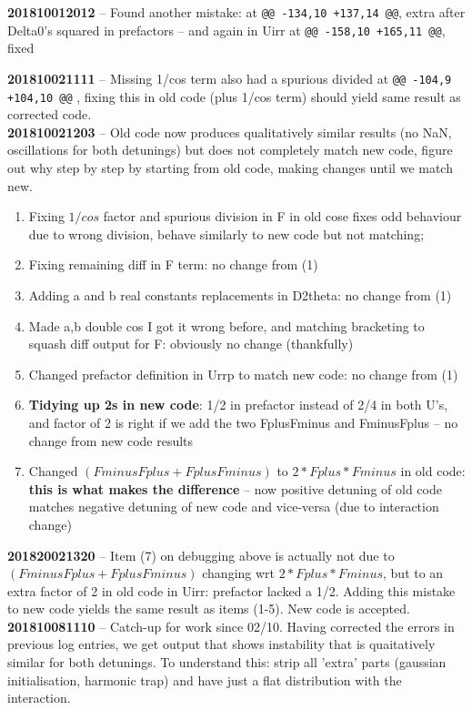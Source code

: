 \documentclass[a4paper,nobalancelastpage]{revtex4-1}
\newcommand{\mmtitle}[1]{\textcolor{multimode}{\textbf{#1}}}
\begin{document}
\mmtitle{201810012012} -- Found another mistake:  at \texttt{@@ -134,10 +137,14 @@}, extra \* after Delta0's squared in prefactors -- and again in Uirr at \texttt{@@ -158,10 +165,11 @@}, fixed

\mmtitle{201810021111} -- Missing 1/cos term also had a spurious divided at  \texttt{@@ -104,9 +104,10 @@} , fixing this in old code (plus 1/cos term) should yield same result as corrected code.\\

\mmtitle{201810021203} -- Old code now produces qualitatively similar results (no NaN, oscillations for both detunings) but does not completely match new code, figure out why step by step by starting from old code, making changes until we match new.
\begin{enumerate}
\item Fixing $1/cos$ factor and spurious division in F in old cose fixes odd behaviour due to wrong division, behave similarly to new code but not matching;
\item Fixing remaining diff in F term: no change from (1)
\item Adding a and b real constants replacements in D2theta: no change from (1)
\item Made a,b double cos I got it wrong before, and matching bracketing to squash diff output for F: obviously no change (thankfully)
\item Changed prefactor definition in Urrp to match new code: no change from (1)
\item \textbf{Tidying up 2s in new code}: 1/2 in prefactor instead of 2/4 in both U's, and factor of 2 is right if we add the two FplusFminus and FminusFplus -- no change from new code results 
\item Changed $(FminusFplus+FplusFminus)$ to $2*Fplus*Fminus$ in old code: \textbf{this is what makes the difference} -- now positive detuning of old code matches negative detuning of new code and vice-versa (due to interaction change)
\end{enumerate}

\mmtitle{201820021320} -- Item (7) on debugging above is actually not due to $(FminusFplus+FplusFminus)$ changing wrt $2*Fplus*Fminus$, but to an extra factor of 2 in old code in Uirr: prefactor lacked a 1/2. Adding this mistake to new code yields the same result as items (1-5). New code is accepted. \\

\mmtitle{201810081110} -- Catch-up for work since 02/10. Having corrected the errors in previous log entries, we get output that shows instability that is quaitatively similar for both detunings. To understand this: strip all 'extra' parts (gaussian initialisation, harmonic trap) and have just a flat distribution with the interaction.\\
\end{document}
